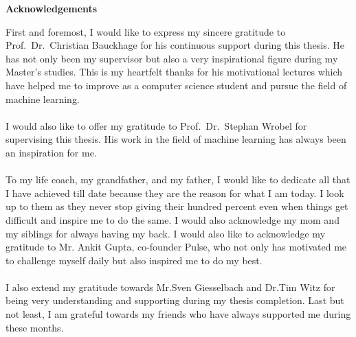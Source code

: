 \thispagestyle{empty}

\centerline{\Large{\textbf{Acknowledgements}}}

\vspace{2cm}

\noindent 
First and foremost, I would like to express my sincere gratitude to Prof.~Dr.~Christian Bauckhage for his continuous support during this thesis. He has not only been my supervisor but also a very inspirational figure during my Master's studies. This is my heartfelt thanks for his motivational lectures which have helped me to improve as a computer science student and pursue the field of machine learning. \\\\
I would also like to offer my gratitude to Prof.~Dr.~Stephan Wrobel for supervising this thesis. His work in the field of machine learning has always been an inspiration for me.\\\\
To my life coach, my grandfather, and my father, I would like to dedicate all that I have achieved till date because they are the reason for what I am today. I look up to them as they never stop giving their hundred percent even when things get difficult and inspire me to do the same. I would also acknowledge my mom and my siblings for always having my back. I would also like to acknowledge my gratitude to Mr. Ankit Gupta, co-founder Pulse, who not only has motivated me to challenge myself daily but also inspired me to do my best.\\\\
I also extend my gratitude towards Mr.Sven Giesselbach and Dr.Tim Witz for being very understanding and supporting during my thesis completion. Last but not least, I am grateful towards my friends who have always supported me during these months.


\newpage
\thispagestyle{empty}

\rule{0cm}{5cm}